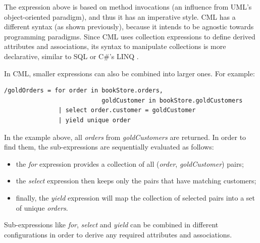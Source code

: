 The expression above is based on method invocations
(an influence from UML's object-oriented paradigm),
and thus it has an imperative style. CML has a different syntax (as shown previously),
because it intends to be agnostic towards programming paradigms.
Since CML uses collection expressions to define derived attributes and associations,
its syntax to manipulate collections is more declarative,
similar to SQL \cite{sql} or C\#'s LINQ \cite{torgersen}.
 
In CML, smaller expressions can also be combined into larger ones. For example:
 
\verbatimfont{\small}
\begin{verbatim}
/goldOrders = for order in bookStore.orders,
                           goldCustomer in bookStore.goldCustomers
               | select order.customer = goldCustomer
               | yield unique order
 \end{verbatim}

In the example above, all \emph{orders} from \emph{goldCustomers} are returned.
In order to find them, the sub-expressions are sequentially evaluated as follows:

\begin{itemize}
\item the \emph{for} expression provides a collection of all (\emph{order}, \emph{goldCustomer}) pairs;
\item the \emph{select} expression then keeps only the pairs that have matching customers;
\item finally, the \emph{yield} expression will map the collection of selected pairs into a set of unique \emph{orders}.
\end{itemize}

Sub-expressions like \emph{for}, \emph{select} and \emph{yield} can be combined in different configurations
in order to derive any required attributes and associations.